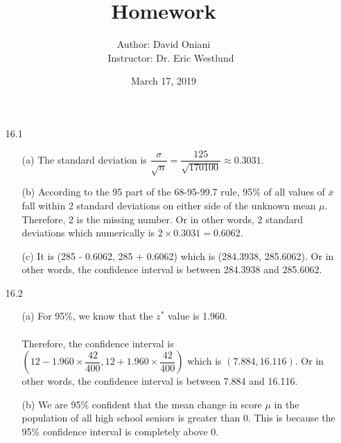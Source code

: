 \documentclass[11pt, a4paper]{article}
\title{\bf{Homework \textnumero 11}}
\author{Author: David Oniani
\\
\ \ \ Instructor: Dr. Eric Westlund}
\date{March 17, 2019}
\begin{document}
\maketitle
\begin{itemize}
\item[16.1]
\begin{itemize}
\item[(a)]
The standard deviation is $\dfrac{\sigma}{\sqrt{n}} = \dfrac{125}{\sqrt{170100}} \approx 0.3031$.

\item[]

\item[(b)]
According to the 95 part of the 68-95-99.7 rule, 95\% of all values
of $\overline{x}$ fall within 2 standard deviations on either side of the unknown
mean $\mu$. Therefore, 2 is the missing number. Or in other words, 2 standard deviations
which numerically is $2 \times 0.3031 = 0.6062$.

\item[]

\item[(c)]
It is (285 - 0.6062, 285 + 0.6062) which is (284.3938, 285.6062).
Or in other words, the confidence interval is between 284.3938 and 285.6062.
\end{itemize}

\item[]
\item[]

\item[16.2]
\begin{itemize}
\item[(a)]
For 95\%, we know that the $z^*$ value is 1.960.\\\\
Therefore, the confidence interval is $(12 - 1.960 \times \dfrac{42}{400}, 12 + 1.960 \times \dfrac{42}{400})$
which is $(7.884, 16.116)$. Or in other words, the confidence interval
is between 7.884 and 16.116.

\item[]

\item[(b)]
We are 95\% confident that the mean change in score $\mu$ in the population of all high
school seniors is greater than 0. This is because the 95\% confidence interval is completely
above 0.
\end{itemize}

\item[]
\item[]


\end{itemize}
\end{document}
